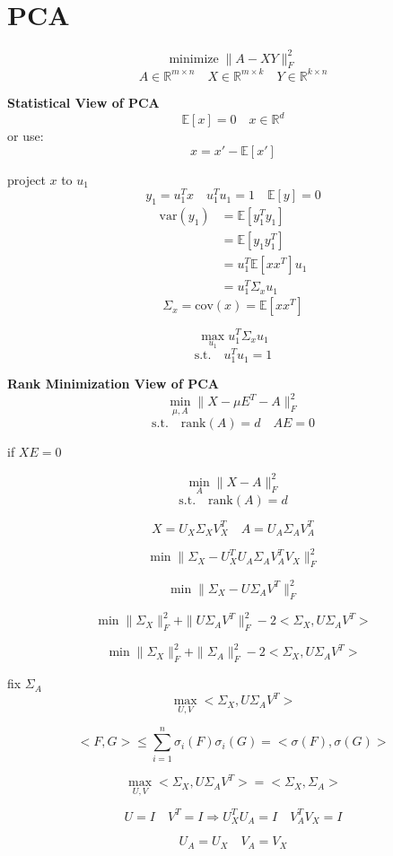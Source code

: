 \documentclass[12pt,a4paper]{article}
\author{surecalois}
\begin{document}
\section{PCA}
\[
\mathrm{minimize}\; \|A-XY\|^2_F
\]
\[
A \in \mathbb{R}^{m\times n} \quad X \in \mathbb{R}^{m\times k} \quad Y\in \mathbb{R}^{k\times n}
\]


\textbf{Statistical View of PCA}
\[
	\mathbb{E}[x] = 0 \quad x \in \mathbb{R}^d
\]
\hspace{\parindent}or use:
\[
	x = x' - \mathbb{E}[x'] 
\]

project $x$ to $u_1$
\[
	y_1 = u_1^Tx \quad u_1^Tu_1 = 1 \quad \mathbb{E}[y] = 0
\]
\begin{align*}
	\mathrm{var}(y_1) & = \mathbb{E}[y_1^Ty_1] \\
		& = \mathbb{E}[y_1y_1^T] \\
		& = u_1^T\mathbb{E}[xx^T]u_1 \\
		& = u_1^T\Sigma_xu_1
\end{align*} 
\[
\Sigma_x = \mathrm{cov}(x) = \mathbb{E}[xx^T]
\]

\[
	\displaystyle \max_{u_1} u_1^T\Sigma_xu_1
\]
\[
\mbox{s.t.} \quad u_1^Tu_1 = 1
\]


\textbf{Rank Minimization View of PCA}
\[
	\min_{\mu,A} \|X -\mu E^T -A \|_F^2
\]
\[
	\mbox{s.t.} \quad \mathrm{rank}(A) = d \quad AE = 0
\]


if $XE = 0$

\[
	\min_{A} \|X-A \|_F^2
\]
\[
	\mbox{s.t.} \quad \mathrm{rank}(A) = d
\]

\[
	X = U_X \Sigma_X V_X^T \quad A = U_A \Sigma_A V_A^T
\]

\[
	\min \| \Sigma_X - U_X^TU_A \Sigma_A V_A^TV_X\|_F^2
\]

\[
	\min \| \Sigma_X - U\Sigma_A V^T\|_F^2
\]

\[
	\min \| \Sigma_X\|_F^2 + \| U\Sigma_A V^T\|_F^2 - 2<\Sigma_X,U\Sigma_A V^T>
\]

\[
	\min \| \Sigma_X\|_F^2 + \| \Sigma_A \|_F^2 - 2<\Sigma_X,U\Sigma_A V^T>
\]

fix $\Sigma_A$
\[
	\max_{U,V} <\Sigma_X,U\Sigma_A V^T>
\]

\[
	<F,G> \leq \sum_{i=1}^{n} \sigma_i(F)\sigma_i(G)=<\sigma(F),\sigma(G)>
\]

\[
	\max_{U,V} <\Sigma_X,U\Sigma_A V^T> = <\Sigma_X,\Sigma_A>
\]

\[
	U = I \quad V^T = I \Rightarrow U_X^TU_A=I \quad V_A^TV_X =I
\]

\[
	U_A = U_X \quad V_A = V_X
\]
\end{document}
